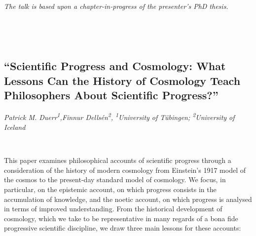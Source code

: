 \documentclass[11pt]{article}
\begin{document}
\textit{The talk is based upon a chapter-in-progress of the presenter’s PhD thesis.}

\ 

\printbibliography[heading=none]


\

\subsection*{\textsf{``Scientific Progress and
Cosmology: What Lessons Can the
History of Cosmology Teach
Philosophers About Scientific
Progress?''}}

\textcolor{moderncvgreen}{
\textit{Patrick M. Duerr\textsuperscript{1},Finnur Dellsén\textsuperscript{2},  %
\newline
\textsuperscript{1}University of Tübingen; \textsuperscript{2}University of Iceland
}
}

\

This paper examines philosophical accounts of scientific progress through a consideration of the
history of modern cosmology from Einstein’s 1917 model of the cosmos to the present-day
standard model of cosmology. We focus, in particular, on the epistemic account, on which
progress consists in the accumulation of knowledge, and the noetic account, on which progress
is analysed in terms of improved understanding. From the historical development of cosmology,
which we take to be representative in many regards of a bona fide progressive scientific
discipline, we draw three main lessons for these accounts:
\end{document}
